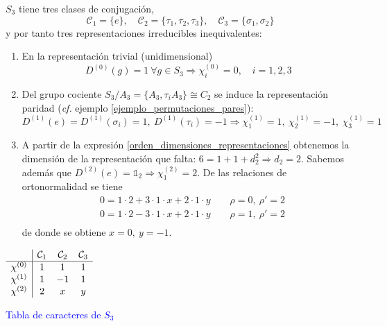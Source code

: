 \begin{ejemplo}

$S_3$ tiene tres clases de conjugación,
\begin{equation*}
\mathcal{C}_1=\{e\},\quad \mathcal{C}_2=\{\tau_1,\tau_2,\tau_3\},\quad \mathcal{C}_3=\{\sigma_1,\sigma_2\} 
\end{equation*}
y por tanto tres representaciones irreducibles inequivalentes:

\begin{enumerate}
\item En la representación trivial (unidimensional) 
\begin{equation*}
D^{(0)}(g)=1\ \forall g\in S_3\Longrightarrow \chi^{(0)}_i=0,\quad i=1,2,3
\end{equation*}
\item Del grupo cociente $S_3/A_3=\{A_3,\tau_iA_3\}\cong C_2$ se induce la representación paridad (\emph{cf.} ejemplo \ref{ejemplo_permutaciones_pares}): 
\begin{equation*}
D^{(1)}(e)=D^{(1)}(\sigma_i)=1,\ D^{(1)}(\tau_i)=-1\Longrightarrow \chi^{(1)}_1=1,\ \chi^{(1)}_2=-1,\ \chi^{(1)}_3=1
\end{equation*} 
\item A partir de la expresión \eqref{orden_dimensiones_representaciones} obtenemos la dimensión de la representación que falta: $6=1+1+d_2^2\Rightarrow d_2=2$. Sabemos además que $D^{(2)}(e)=\mathbb{1}_2\Rightarrow \chi^{(2)}_1=2$. De las relaciones de ortonormalidad se tiene
\begin{equation*}
\begin{aligned}
&0=1\cdot 2+3\cdot 1\cdot x+2\cdot 1\cdot y\qquad \rho=0,\ \rho'=2\\
&0=1\cdot 2-3\cdot 1\cdot x+2\cdot 1\cdot y\qquad \rho=1,\ \rho'=2\\
\end{aligned}
\end{equation*}
de donde se obtiene $x=0,\ y=-1$.
\end{enumerate}


\begin{table}[ht]
\centering
\textcolor{blue}{
$\begin{array}{c|c c c}
& \mathcal{C}_1&\mathcal{C}_2&\mathcal{C}_3\\
\hline
\chi^{(0)} & 1 & 1 & 1 \\
\chi^{(1)} & 1 & -1 & 1 \\
\chi^{(2)} & 2 & x & y \\
\end{array}$
\caption{Tabla de caracteres de $S_3$}}
\end{table}
\end{ejemplo} 

